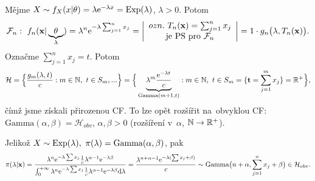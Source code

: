 \begin{example}
	Mějme $X\sim f_X(x|\theta)=\lambda\mathrm{e}^{-\lambda x}=\mathrm{Exp}(\lambda)$, $\lambda>0$. Potom $$\mathcal{F}_n: ~f_n(\textbf{x}|\underbrace{\theta}_{\lambda})=\lambda^n\mathrm{e}^{-\lambda\sum_{j=1}^n x_j}=\left|\begin{array}{c}
	ozn.~T_n(\textbf{x})=\sum_{j=1}^n x_j\\\text{je PS pro~}\mathcal{F}_n
	\end{array}
	\right|=1\cdot g_n\big(\lambda,T_n(\textbf{x})\big).$$
	Označme $\sum_{j=1}^n x_j=t$. Potom $$\mathcal{H}=\Big\{ \frac{g_m(\lambda,t)}{c}:m\in\mathbb{N},~t\in S_m,... \Big\}=\Big\{\underbrace{\lambda^m\frac{\mathrm{e}^{-\lambda t}}{c}}_{\mathrm{Gamma}(m+1,t)}:m\in\mathbb{N},~t\in S_m=\{\textbf{t}=\sum_{j=1}^m x_j \}=\mathbb{R}^+\Big\},$$
	čímž jsme získali přirozenou CF.
	To lze opět rozšířit na~obvyklou CF:  $\mathrm{Gamma} (\alpha,\beta)=\mathcal{H}_{obv}$, $\alpha,\beta >0$ (rozšíření v~$\alpha$, $\mathbb{N}\rightarrow \mathbb{R}^{+}$).
	
	Jelikož $X\sim\mathrm{Exp}(\lambda),~\pi(\lambda)=\mathrm{Gamma}(\alpha,\beta)$, pak 
	$$ \pi(\lambda|\textbf{x})=\frac{\lambda^n\mathrm{e}^{-\lambda\sum x_j}\frac{1}{c}\lambda^{\alpha-1}\mathrm{e}^{-\lambda\beta}}{\int_{0}^{+\infty}\lambda^n\mathrm{e}^{-\lambda\sum x_j}\frac{1}{c}\lambda^{\alpha-1}\mathrm{e}^{-\lambda\beta}\mathrm{d}\lambda}=\frac{\lambda^{n+\alpha-1}\mathrm{e}^{-\lambda(\sum x_j+\beta)}}{c}\sim\mathrm{Gamma}\big(n+\alpha,\sum\limits_{j=1}^{n} x_j+\beta\big)\in\mathcal{H}_\text{obv} .$$
	
\end{example}
